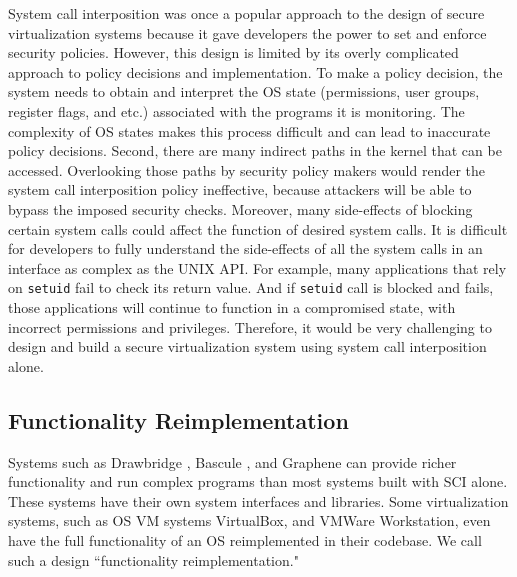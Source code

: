 System call interposition was once a popular approach to the design of secure
virtualization systems because it gave developers the power to set and enforce
security policies. 
However, this design
is limited by its overly complicated approach to policy decisions and implementation.
To make a policy decision, the system needs to
obtain and interpret the OS state (permissions, user groups, register flags, and etc.) 
associated with the programs it is monitoring.
The complexity of OS states makes this process difficult and can lead to
inaccurate policy decisions.
Second, there are many indirect paths in the kernel that can be accessed.
Overlooking those paths by security policy makers would render the
system call interposition policy ineffective, because attackers will be able to
bypass the imposed security checks. 
Moreover, many side-effects of blocking
certain system calls could affect the function of desired system calls.
It is difficult for developers to fully understand the side-effects of all the
system calls in an interface as complex as the UNIX API. 
For example, many applications that rely on \texttt{setuid} fail to check its return value. 
And if \texttt{setuid} call is blocked and fails, those applications will continue to function in a compromised state, 
with incorrect permissions and privileges. 
Therefore, it would be very challenging to design and build a secure virtualization system using
system call interposition alone.

\subsection{Functionality Reimplementation}
Systems such as  Drawbridge \cite{Drawbridge-11},
 Bascule \cite{Bascule}, and Graphene \cite{Graphene-14} can
provide richer functionality and run complex programs than most systems built
with SCI alone. These systems have their own system
interfaces and libraries. Some virtualization
systems, such as OS VM systems VirtualBox, and VMWare Workstation, even have the
full functionality of an OS reimplemented in their codebase. We call such a design
``functionality reimplementation."


